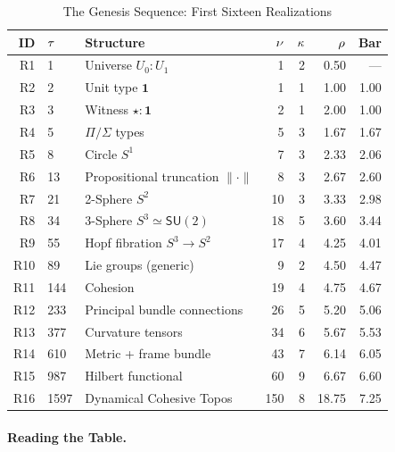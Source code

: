 \documentclass[11pt]{article}
\theoremstyle{definition}
\begin{document}
\begin{table}[htbp]
\centering
\caption{The Genesis Sequence: First Sixteen Realizations}
\label{tab:genesis-detailed}
\small
\begin{tabular}{@{}rllrrrr@{}}
\toprule
\textbf{ID} & $\boldmath{\tau}$ & \textbf{Structure} & $\boldmath{\nu}$ & $\boldmath{\kappa}$ & $\boldmath{\rho}$ & \textbf{Bar} \\
\midrule
R1  & 1    & Universe $U_0 : U_1$                & 1   & 2 & 0.50 & ---  \\
R2  & 2    & Unit type $\mathbf{1}$              & 1   & 1 & 1.00 & 1.00 \\
R3  & 3    & Witness $\star : \mathbf{1}$        & 2   & 1 & 2.00 & 1.00 \\
R4  & 5    & $\Pi/\Sigma$ types                   & 5   & 3 & 1.67 & 1.67 \\
R5  & 8    & Circle $S^1$                         & 7   & 3 & 2.33 & 2.06 \\
R6  & 13   & Propositional truncation $\|\cdot\|$ & 8   & 3 & 2.67 & 2.60 \\
R7  & 21   & 2-Sphere $S^2$                       & 10  & 3 & 3.33 & 2.98 \\
R8  & 34   & 3-Sphere $S^3 \simeq \mathsf{SU}(2)$ & 18  & 5 & 3.60 & 3.44 \\
R9  & 55   & Hopf fibration $S^3 \to S^2$        & 17  & 4 & 4.25 & 4.01 \\
R10 & 89   & Lie groups (generic)                 & 9   & 2 & 4.50 & 4.47 \\
R11 & 144  & Cohesion                             & 19  & 4 & 4.75 & 4.67 \\
R12 & 233  & Principal bundle connections         & 26  & 5 & 5.20 & 5.06 \\
R13 & 377  & Curvature tensors                    & 34  & 6 & 5.67 & 5.53 \\
R14 & 610  & Metric + frame bundle                & 43  & 7 & 6.14 & 6.05 \\
R15 & 987  & Hilbert functional                   & 60  & 9 & 6.67 & 6.60 \\
R16 & 1597 & Dynamical Cohesive Topos             & 150 & 8 & 18.75 & 7.25 \\
\bottomrule
\end{tabular}
\end{table}

\paragraph{Reading the Table.}
\end{document}
